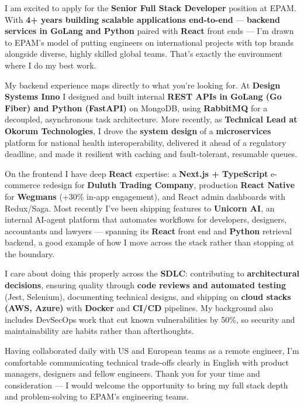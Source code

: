 \documentclass[11pt,a4paper]{awesome-cv}
\begin{document}
\makecvheader[R]
\makelettertitle

\begin{cvletter}

I am excited to apply for the \textbf{Senior Full Stack Developer} position at EPAM. With \textbf{4+ years building scalable applications end-to-end} — \textbf{backend services in GoLang and Python} paired with \textbf{React} front ends — I'm drawn to EPAM's model of putting engineers on international projects with top brands alongside diverse, highly skilled global teams. That's exactly the environment where I do my best work.

My backend experience maps directly to what you're looking for. At \textbf{Design Systems Inno} I designed and built internal \textbf{REST APIs in GoLang (Go Fiber) and Python (FastAPI)} on MongoDB, using \textbf{RabbitMQ} for a decoupled, asynchronous task architecture. More recently, as \textbf{Technical Lead at Okorum Technologies}, I drove the \textbf{system design} of a \textbf{microservices} platform for national health interoperability, delivered it ahead of a regulatory deadline, and made it resilient with caching and fault-tolerant, resumable queues.

On the frontend I have deep \textbf{React} expertise: a \textbf{Next.js + TypeScript} e-commerce redesign for \textbf{Duluth Trading Company}, production \textbf{React Native} for \textbf{Wegmans} (+30\% in-app engagement), and React admin dashboards with Redux/Saga. Most recently I've been shipping features to \textbf{Unicorn AI}, an internal AI-agent platform that automates workflows for developers, designers, accountants and lawyers — spanning its \textbf{React} front end and \textbf{Python} retrieval backend, a good example of how I move across the stack rather than stopping at the boundary.

I care about doing this properly across the \textbf{SDLC}: contributing to \textbf{architectural decisions}, ensuring quality through \textbf{code reviews and automated testing} (Jest, Selenium), documenting technical designs, and shipping on \textbf{cloud stacks (AWS, Azure)} with \textbf{Docker} and \textbf{CI/CD} pipelines. My background also includes DevSecOps work that cut known vulnerabilities by 50\%, so security and maintainability are habits rather than afterthoughts.

Having collaborated daily with US and European teams as a remote engineer, I'm comfortable communicating technical trade-offs clearly in English with product managers, designers and fellow engineers. Thank you for your time and consideration — I would welcome the opportunity to bring my full stack depth and problem-solving to EPAM's engineering teams.

\end{cvletter}

\makeletterclosing
\end{document}
